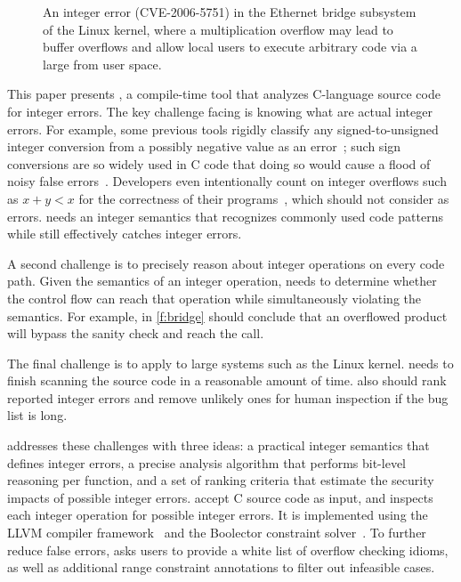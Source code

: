 \begin{figure}[t]
\centering

\vspace{-1em}
\caption{An integer error (CVE-2006-5751) in the Ethernet
bridge subsystem of the Linux kernel, where a multiplication overflow
may lead to buffer overflows and allow local users to execute
arbitrary code via a large  from user space.
}
\label{f:bridge}
\end{figure}


This paper presents \sys, a compile-time tool that analyzes C-language
source code for integer errors.
%
The key challenge facing \sys is knowing what are actual integer
errors.
For example, some previous tools
rigidly classify any signed-to-unsigned integer conversion from a
possibly negative value as an error~\cite{brumley:rich, moy:z3prefix,
seacord:secure-c}; such sign conversions are so widely used in C
code that doing so would cause a flood of noisy false
errors~\cite[\subsectionautorefname~6.2]{moy:z3prefix}.
Developers even intentionally count on integer overflows
such as $x + y < x$ for the correctness of their programs~\cite{ioc},
which \sys should not consider as errors.
\sys needs an integer semantics that recognizes commonly used code
patterns while still effectively catches integer errors.

A second challenge is to precisely reason about integer operations
on every code path.  Given the semantics of an integer operation,
\sys needs to determine whether the control flow can reach that
operation while simultaneously violating the semantics.  For
example, in \autoref{f:bridge} \sys should conclude that an overflowed
product  will bypass the sanity check and reach the
 call.

The final challenge is to apply \sys to large systems such as the
Linux kernel.  \sys needs to finish scanning the source code in a
reasonable amount of time.  \sys also should rank reported integer
errors and remove unlikely ones for human inspection if the bug
list is long.

\sys addresses these challenges with three ideas: a practical integer
semantics that defines integer errors, a precise analysis algorithm
that performs bit-level reasoning per function, and a set of ranking
criteria that estimate the security impacts of possible integer
errors.  \sys accept C source code as input, and inspects each
integer operation for possible integer errors.
%
It is implemented using the LLVM compiler framework~\cite{lattner:llvm}
and the Boolector constraint solver~\cite{boolector}.
%
To further reduce false errors, \sys asks users to provide a white
list of overflow checking idioms, as well as additional range
constraint annotations to filter out infeasible cases.

